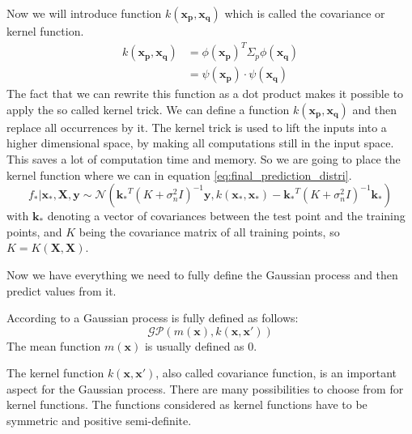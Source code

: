 Now we will introduce function $k(\mathbf{x_p}, \mathbf{x_q})$ which is called the covariance or kernel function. 
\begin{equation}\label{kernel}
\begin{aligned}
k(\mathbf{x_p}, \mathbf{x_q}) &= \phi(\mathbf{x_p})^T\Sigma_p\phi(\mathbf{x_q})\\
&= \psi(\mathbf{x_p}) \cdot \psi(\mathbf{x_q})
\end{aligned}
\end{equation}
The fact that we can rewrite this function as a dot product makes it possible to apply the so called kernel trick. \cite[p. 12]{Rasmussen:2005:GPM:1162254} We can define a function $k(\mathbf{x_p},\mathbf{x_q})$ and then replace all occurrences by it. The kernel trick is used to lift the inputs into a higher dimensional space, by making all computations still in the input space. This saves a lot of computation time and memory. So we are going to place the kernel function where we can in equation \ref{eq:final_prediction_distri}.
\begin{equation}\label{prediction_distri_with_kernel}
f_*|\mathbf{x_*},\mathbf{X}, \mathbf{y} \sim \mathcal{N}(\mathbf{k_*}^T(K+\sigma_n^2I)^{-1}\mathbf{y}, k(\mathbf{x_*},\mathbf{x_*})-\mathbf{k_*}^T(K+\sigma_n^2I)^{-1}\mathbf{k_*})
\end{equation}
with $\mathbf{k_*}$ denoting a vector of covariances between the test point and the training points, and $K$ being the covariance matrix of all training points, so $K = K(\mathbf{X}, \mathbf{X})$.

Now we have everything we need to fully define the Gaussian process and then predict values from it. 

According to \cite[p. 13]{Rasmussen:2005:GPM:1162254} a Gaussian process is fully defined as follows:
\begin{equation}\label{eq:GP}
\mathcal{GP}(m(\mathbf{x}),k(\mathbf{x},\mathbf{x'}))
\end{equation}
The mean function $m(\mathbf{x})$ is usually defined as 0. 

The kernel function $k(\mathbf{x},\mathbf{x'})$, also called covariance function, is an important aspect for the Gaussian process. There are many possibilities to choose from for kernel functions. The functions considered as kernel functions have to be symmetric and positive semi-definite. 

